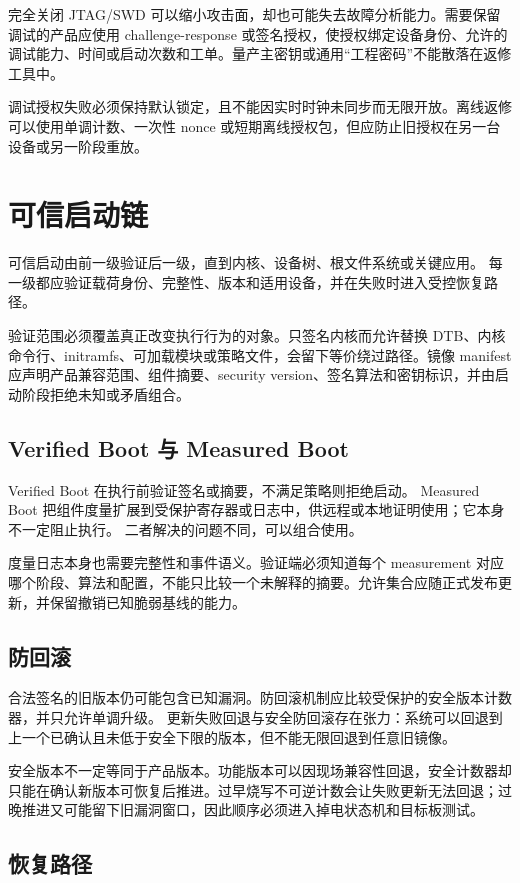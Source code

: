 完全关闭 JTAG/SWD 可以缩小攻击面，却也可能失去故障分析能力。需要保留调试的产品应使用 challenge-response 或签名授权，使授权绑定设备身份、允许的调试能力、时间或启动次数和工单。量产主密钥或通用“工程密码”不能散落在返修工具中。

调试授权失败必须保持默认锁定，且不能因实时时钟未同步而无限开放。离线返修可以使用单调计数、一次性 nonce 或短期离线授权包，但应防止旧授权在另一台设备或另一阶段重放。

\section{可信启动链}

可信启动由前一级验证后一级，直到内核、设备树、根文件系统或关键应用。
每一级都应验证载荷身份、完整性、版本和适用设备，并在失败时进入受控恢复路径。

验证范围必须覆盖真正改变执行行为的对象。只签名内核而允许替换 DTB、内核命令行、initramfs、可加载模块或策略文件，会留下等价绕过路径。镜像 manifest 应声明产品兼容范围、组件摘要、security version、签名算法和密钥标识，并由启动阶段拒绝未知或矛盾组合。

\subsection{Verified Boot 与 Measured Boot}

Verified Boot 在执行前验证签名或摘要，不满足策略则拒绝启动。
Measured Boot 把组件度量扩展到受保护寄存器或日志中，供远程或本地证明使用；它本身不一定阻止执行。
二者解决的问题不同，可以组合使用。

度量日志本身也需要完整性和事件语义。验证端必须知道每个 measurement 对应哪个阶段、算法和配置，不能只比较一个未解释的摘要。允许集合应随正式发布更新，并保留撤销已知脆弱基线的能力。

\subsection{防回滚}

合法签名的旧版本仍可能包含已知漏洞。防回滚机制应比较受保护的安全版本计数器，并只允许单调升级。
更新失败回退与安全防回滚存在张力：系统可以回退到上一个已确认且未低于安全下限的版本，但不能无限回退到任意旧镜像。

安全版本不一定等同于产品版本。功能版本可以因现场兼容性回退，安全计数器却只能在确认新版本可恢复后推进。过早烧写不可逆计数会让失败更新无法回退；过晚推进又可能留下旧漏洞窗口，因此顺序必须进入掉电状态机和目标板测试。

\subsection{恢复路径}

